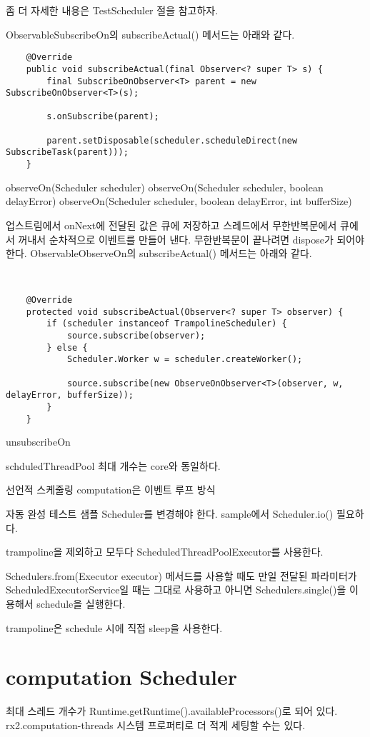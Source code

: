 \documentclass{book}
\begin{document}
{좀 더 자세한 내용은 TestScheduler 절을 참고하자.

ObservableSubscribeOn의 subscribeActual() 메서드는 아래와 같다.
\begin{verbatim}
    @Override
    public void subscribeActual(final Observer<? super T> s) {
        final SubscribeOnObserver<T> parent = new SubscribeOnObserver<T>(s);

        s.onSubscribe(parent);

        parent.setDisposable(scheduler.scheduleDirect(new SubscribeTask(parent)));
    }
\end{verbatim}

observeOn(Scheduler scheduler)
observeOn(Scheduler scheduler, boolean delayError)
observeOn(Scheduler scheduler, boolean delayError, int bufferSize)

업스트림에서 onNext에 전달된 값은 큐에 저장하고 스레드에서 무한반복문에서 큐에서 꺼내서 순차적으로 이벤트를 만들어 낸다.
무한반복문이 끝나려면 dispose가 되어야 한다.
ObservableObserveOn의 subscribeActual() 메서드는 아래와 같다.
\begin{verbatim}


    @Override
    protected void subscribeActual(Observer<? super T> observer) {
        if (scheduler instanceof TrampolineScheduler) {
            source.subscribe(observer);
        } else {
            Scheduler.Worker w = scheduler.createWorker();

            source.subscribe(new ObserveOnObserver<T>(observer, w, delayError, bufferSize));
        }
    }
\end{verbatim}

unsubscribeOn

schduledThreadPool 최대 개수는 core와 동일하다.

선언적 스케줄링
computation은 이벤트 루프 방식

자동 완성 테스트 샘플
Scheduler를 변경해야 한다.
sample에서 Scheduler.io() 필요하다.

trampoline을 제외하고 모두다 ScheduledThreadPoolExecutor를 사용한다.

Schedulers.from(Executor executor) 메서드를 사용할 때도 만일 전달된 파라미터가 ScheduledExecutorService일 때는
그대로 사용하고 아니면 Schedulers.single()을 이용해서 schedule을 실행한다.

trampoline은 schedule 시에 직접 sleep을 사용한다.

\section{computation Scheduler}
최대 스레드 개수가 Runtime.getRuntime().availableProcessors()로 되어 있다.
rx2.computation-threads 시스템 프로퍼티로 더 적게 세팅할 수는 있다.


}
\end{document}

